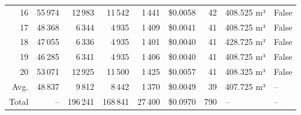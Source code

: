 \documentclass[a4paper,11pt]{article}
\begin{document}
\begin{table}[ht]
\begin{tabular}{r r r r r r r p{3cm} l}
16 & 55\,974 & 12\,983 & 11\,542 & 1\,441 & \$0.0058 & 42 & 408.525 m³ & False \\
17 & 48\,368 & 6\,344 & 4\,935 & 1\,409 & \$0.0041 & 41 & 408.725 m³ & False \\
18 & 47\,055 & 6\,336 & 4\,935 & 1\,401 & \$0.0040 & 41 & 428.725 m³ & False \\
19 & 46\,285 & 6\,341 & 4\,935 & 1\,406 & \$0.0040 & 41 & 408.725 m³ & False \\
20 & 53\,071 & 12\,925 & 11\,500 & 1\,425 & \$0.0057 & 41 & 408.325 m³ & False \\
\hline
Avg. & 48\,837 & 9\,812 & 8\,442 & 1\,370 & \$0.0049 & 39 & 407.725 m³ & -- \\
Total & -- & 196\,241 & 168\,841 & 27\,400 & \$0.0970 & 790 & -- & -- \\
\hline
\end{tabular}
\end{table}

\clearpage
\end{document}

